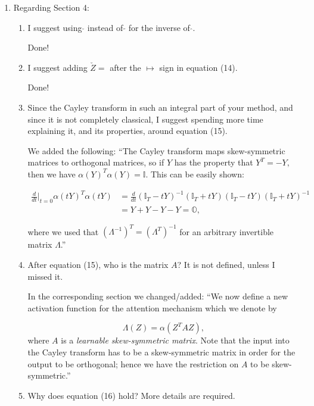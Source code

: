 \documentclass{article}
\begin{document}
\begin{enumerate}
\item Regarding Section 4:
\begin{enumerate}[label=\arabic*.]
\item I suggest using $\check{}$ instead of $\tilde{}$ for the inverse of $\hat{}$.

    {\color{mred} Done!}
\item I suggest adding $\check{Z} =$ after the $\mapsto$ sign in equation (14).

    {\color{mred} Done!}
\item Since the Cayley transform in such an integral part of your method, and since it is not completely classical, I suggest spending more time explaining it, and its properties, around equation (15).

    {\color{mred} We added the following: ``The Cayley transform maps skew-symmetric matrices to orthogonal matrices, so if $Y$ has the property that $Y^T = -Y,$ then we have $\alpha(Y)^T\alpha(Y) = \mathbb{I}.$ This can be easily shown:

    \begin{equation*}
    \begin{aligned}
    \frac{d}{dt}\Big|_{t=0}\alpha(tY)^T\alpha(tY) & = \frac{d}{dt}(\mathbb{I}_{T} - tY)^{-1}(\mathbb{I}_{T} + tY)(\mathbb{I}_{T} - tY)(\mathbb{I}_{T} + tY)^{-1} \\
                                                  & = Y + Y - Y - Y = \mathbb{O},
    \end{aligned}
    \end{equation*}
    
    where we used that $(\Lambda^{-1})^T = (\Lambda^T)^{-1}$ for an arbitrary invertible matrix $\Lambda$.''}
\item After equation (15), who is the matrix $A$? It is not defined, unless I missed it.

    {\color{mred} In the corresponding section we changed/added: ``We now define a new activation function for the attention mechanism which we denote by 

    \begin{equation*}
    \Lambda(Z) = \alpha (Z^T A Z),
    \end{equation*}    
    where $A$ is a \textit{learnable skew-symmetric matrix}. Note that the input into the Cayley transform has to be a skew-symmetric matrix in order for the output to be orthogonal; hence we have the restriction on $A$ to be skew-symmetric.''}

\item Why does equation (16) hold? More details are required.


\end{enumerate}
\end{enumerate}
\end{document}
